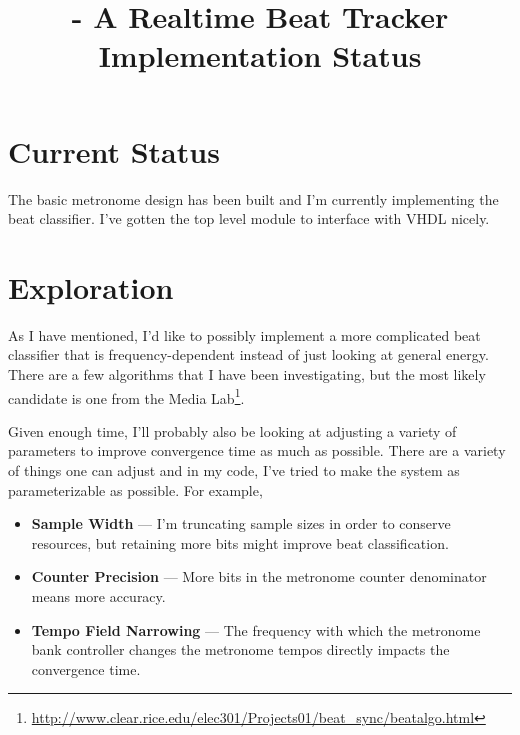 \documentclass[letterpaper]{article}
\title{\projname{} - A Realtime Beat Tracker \\ Implementation Status}
\begin{document}
\maketitle

\section{Current Status}

    The basic metronome design has been built and I'm currently implementing
    the beat classifier.  I've gotten the top level module to interface with
    VHDL nicely.

\section{Exploration}

    As I have mentioned, I'd like to possibly implement a more complicated beat
    classifier that is frequency-dependent instead of just looking at general
    energy.  There are a few algorithms that I have been investigating, but the
    most likely candidate is one from the Media
    Lab\footnote{\url{http://www.clear.rice.edu/elec301/Projects01/beat_sync/beatalgo.html}}.

    Given enough time, I'll probably also be looking at adjusting a variety of
    parameters to improve convergence time as much as possible.  There are a
    variety of things one can adjust and in my code, I've tried to make the
    system as parameterizable as possible.  For example,
    
    \begin{itemize}
        \item \textbf{Sample Width} --- I'm truncating sample sizes in order to
            conserve resources, but retaining more bits might improve beat
            classification.

        \item \textbf{Counter Precision} --- More bits in the metronome counter
            denominator means more accuracy.
            
        \item \textbf{Tempo Field Narrowing}  --- The frequency with which the
            metronome bank controller changes the metronome tempos directly
            impacts the convergence time.
    \end{itemize}
\end{document}
